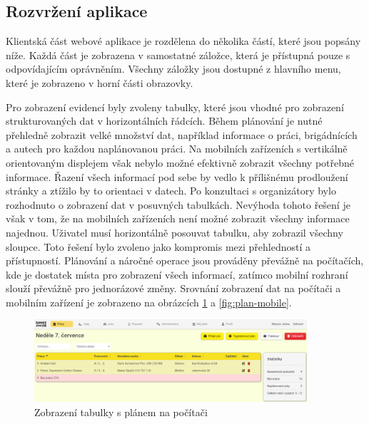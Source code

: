 \subsection{Rozvržení aplikace}

Klientská část webové aplikace je rozdělena do několika částí, které jsou popsány níže. Každá část je zobrazena v samostatné záložce, která je přístupná
pouze s odpovídajícím oprávněním. Všechny záložky jsou dostupné z hlavního menu, které je zobrazeno v horní části obrazovky.

Pro zobrazení evidencí byly zvoleny tabulky, které jsou vhodné pro zobrazení strukturovaných dat v horizontálních řádcích.
Během plánování je nutné přehledně zobrazit velké množství dat, například informace o práci, brigádnících a autech pro každou naplánovanou práci.
Na mobilních zařízeních s vertikálně orientovaným displejem však nebylo možné efektivně zobrazit všechny potřebné informace.
Řazení všech informací pod sebe by vedlo k přílišnému prodloužení stránky a ztížilo by to orientaci v datech. Po konzultaci s organizátory
bylo rozhodnuto o zobrazení dat v posuvných tabulkách. Nevýhoda tohoto řešení je však v tom, že na mobilních zařízeních není možné zobrazit všechny
informace najednou. Uživatel musí horizontálně posouvat tabulku, aby zobrazil všechny sloupce. Toto řešení bylo zvoleno jako kompromis mezi
přehledností a přístupností. Plánování a náročné operace jsou prováděny převážně na počítačích, kde je dostatek místa pro zobrazení všech informací,
zatímco mobilní rozhraní slouží převážně pro jednorázové změny. Srovnání zobrazení dat na počítači a mobilním zařízení je zobrazeno na obrázcích \ref{fig:plan-pc} a \ref{fig:plan-mobile}.

\begin{figure}[ht]
    \centering
    \includegraphics[width=0.9\textwidth]{chapters/images/plan-pc.pdf}
    \caption{Zobrazení tabulky s plánem na počítači}
    \label{fig:plan-pc}
\end{figure}

